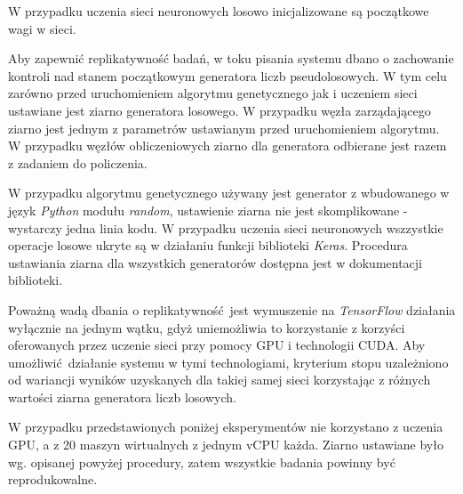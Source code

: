 W przypadku uczenia sieci neuronowych losowo inicjalizowane są początkowe wagi w sieci.

Aby zapewnić replikatywność badań, w toku pisania systemu dbano o zachowanie kontroli nad stanem początkowym generatora liczb pseudolosowych.
W tym celu zarówno przed uruchomieniem algorytmu genetycznego jak i uczeniem sieci ustawiane jest ziarno generatora losowego.
W przypadku węzła zarządającego ziarno jest jednym z parametrów ustawianym przed uruchomieniem algorytmu.
W przypadku węzłów obliczeniowych ziarno dla generatora odbierane jest razem z zadaniem do policzenia.

W przypadku algorytmu genetycznego używany jest generator z wbudowanego w język \textit{Python} modułu \textit{random}, ustawienie ziarna nie jest skomplikowane - wystarczy jedna linia kodu.
W przypadku uczenia sieci neuronowych wszzystkie operacje losowe ukryte są w działaniu funkcji biblioteki \textit{Keras}.
Procedura ustawiania ziarna dla wszystkich generatorów dostępna jest w dokumentacji biblioteki. \cite{chollet2015keras}

Poważną wadą dbania o replikatywność jest wymuszenie na \textit{TensorFlow} działania wyłącznie na jednym wątku, gdyż uniemożliwia to korzystanie z korzyści oferowanych przez uczenie sieci przy pomocy GPU i technologii CUDA.
Aby umożliwić działanie systemu w tymi technologiami, kryterium stopu uzależniono od wariancji wyników uzyskanych dla takiej samej sieci korzystając z różnych wartości ziarna generatora liczb losowych.

W przypadku przedstawionych poniżej eksperymentów nie korzystano z uczenia GPU, a z 20 maszyn wirtualnych z jednym vCPU każda.
Ziarno ustawiane było wg. opisanej powyżej procedury, zatem wszystkie badania powinny być reprodukowalne.

